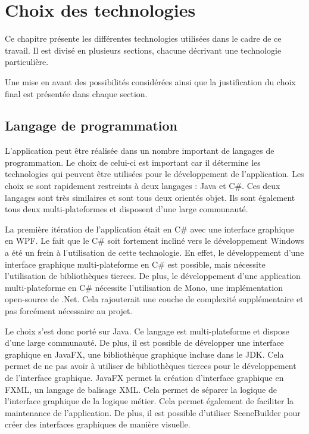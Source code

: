 \section{Choix des technologies}
Ce chapitre présente les différentes technologies utilisées dans le cadre de ce travail. Il est divisé en plusieurs sections, chacune décrivant une technologie particulière.

Une mise en avant des possibilités considérées ainsi que la justification du choix final est présentée dans chaque section.

\subsection{Langage de programmation}
L'application peut être réalisée dans un nombre important de langages de programmation. Le choix de celui-ci est important car il détermine les technologies qui peuvent être utilisées pour le développement de l'application.
Les choix se sont rapidement restreints à deux langages : Java et C\#. Ces deux langages sont très similaires et sont tous deux orientés objet. Ils sont également tous deux multi-plateformes et disposent d'une large communauté.

La première itération de l'application était en C\# avec une interface graphique en WPF. Le fait que le C\# soit fortement incliné vers le développement Windows a été un frein à l'utilisation de cette technologie. En effet, le développement d'une interface graphique multi-plateforme en C\# est possible, mais nécessite l'utilisation de bibliothèques tierces. De plus, le développement d'une application multi-plateforme en C\# nécessite l'utilisation de Mono, une implémentation open-source de .Net. Cela rajouterait une couche de complexité supplémentaire et pas forcément nécessaire au projet.

Le choix s'est donc porté sur Java. Ce langage est multi-plateforme et dispose d'une large communauté. De plus, il est possible de développer une interface graphique en JavaFX, une bibliothèque graphique incluse dans le JDK. Cela permet de ne pas avoir à utiliser de bibliothèques tierces pour le développement de l'interface graphique. JavaFX permet la création d'interface graphique en FXML, un langage de balisage XML. Cela permet de séparer la logique de l'interface graphique de la logique métier. Cela permet également de faciliter la maintenance de l'application. De plus, il est possible d'utiliser SceneBuilder pour créer des interfaces graphiques de manière visuelle.

